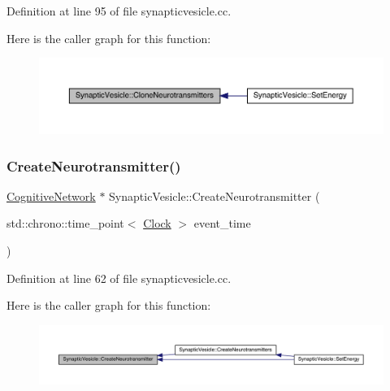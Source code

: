 Definition at line 95 of file synapticvesicle.\+cc.

Here is the caller graph for this function\+:\nopagebreak
\begin{figure}[H]
\begin{center}
\leavevmode
\includegraphics[width=350pt]{class_synaptic_vesicle_aa610e38786a8c9978d9c00bca40a5200_icgraph}
\end{center}
\end{figure}
\mbox{\label{class_synaptic_vesicle_a89f4fd3ed27a7dc768de215534325d6a}} 
\subsubsection{\texorpdfstring{Create\+Neurotransmitter()}{CreateNeurotransmitter()}}
{\footnotesize\ttfamily \hyperlink{class_cognitive_network}{Cognitive\+Network} $\ast$ Synaptic\+Vesicle\+::\+Create\+Neurotransmitter (\begin{DoxyParamCaption}\item[{std\+::chrono\+::time\+\_\+point$<$ \hyperlink{universe_8h_a0ef8d951d1ca5ab3cfaf7ab4c7a6fd80}{Clock} $>$}]{event\+\_\+time }\end{DoxyParamCaption})}



Definition at line 62 of file synapticvesicle.\+cc.

Here is the caller graph for this function\+:\nopagebreak
\begin{figure}[H]
\begin{center}
\leavevmode
\includegraphics[width=350pt]{class_synaptic_vesicle_a89f4fd3ed27a7dc768de215534325d6a_icgraph}
\end{center}
\end{figure}
\mbox{\label{class_synaptic_vesicle_a052b85a42c2d55ca146665c40cbabffd}} 
